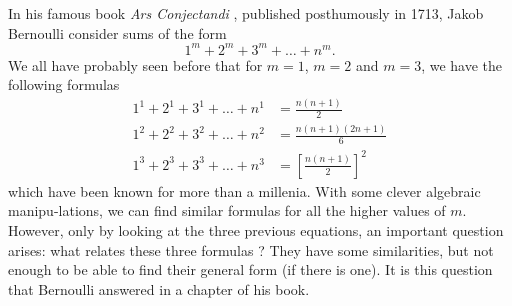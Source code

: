 In his famous book \textit{Ars Conjectandi} \cite{bernoulli1713ars}, published posthumously in 1713, Jakob Bernoulli consider sums of the form
$$1^m + 2^m + 3^m + \dots + n^m.$$
We all have probably seen before that for $m=1$, $m = 2$ and $m=3$, we have the following formulas
\begin{align*}
    1^1 + 2^1 + 3^1 + \dots + n^1 &= \frac{n(n+1)}{2} \\
    1^2 + 2^2 + 3^2 + \dots + n^2 &= \frac{n(n+1)(2n+1)}{6} \\
    1^3 + 2^3 + 3^3 + \dots + n^3 &= \left[\frac{n(n+1)}{2}\right]^2
\end{align*}
which have been known for more than a millenia. With some clever algebraic manipu-lations, we can find similar formulas for all the higher values of $m$. However, only by looking at the three previous equations, an important question arises: what relates these three formulas ? They have some similarities, but not enough to be able to find their general form (if there is one). It is this question that Bernoulli answered in a chapter of his book.

